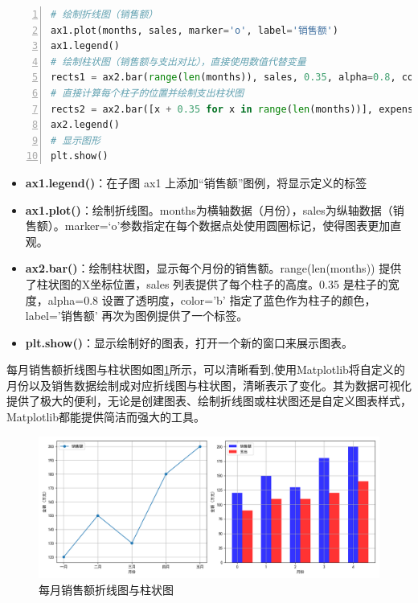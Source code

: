 \begin{lstlisting}[language={python},label={Matplotlib简单操作2},caption={Matplotlib简单操作2}, basicstyle=\footnotesize\ttfamily, breaklines=true, numbers=left, frame=single]
# 绘制折线图（销售额）
ax1.plot(months, sales, marker='o', label='销售额')
ax1.legend()
# 绘制柱状图（销售额与支出对比），直接使用数值代替变量
rects1 = ax2.bar(range(len(months)), sales, 0.35, alpha=0.8, color='b', label='销售额')
# 直接计算每个柱子的位置并绘制支出柱状图
rects2 = ax2.bar([x + 0.35 for x in range(len(months))], expenses, 0.35, alpha=0.8, color='r', label='支出')
ax2.legend()
# 显示图形
plt.show()

\end{lstlisting}
\begin{itemize}
    \item \textbf{ax1.legend()}：在子图 ax1 上添加“销售额”图例，将显示定义的标签
    \item \textbf{ax1.plot()}：绘制折线图。months为横轴数据（月份），sales为纵轴数据（销售额）。marker=‘o’参数指定在每个数据点处使用圆圈标记，使得图表更加直观。
    \item \textbf{ax2.bar()}：绘制柱状图，显示每个月份的销售额。range(len(months)) 提供了柱状图的X坐标位置，sales 列表提供了每个柱子的高度。0.35 是柱子的宽度，alpha=0.8 设置了透明度，color='b' 指定了蓝色作为柱子的颜色，label='销售额' 再次为图例提供了一个标签。
    \item \textbf{plt.show()}：显示绘制好的图表，打开一个新的窗口来展示图表。
\end{itemize}
每月销售额折线图与柱状图如图\ref{fig:每月销售额}所示，可以清晰看到,使用Matplotlib将自定义的月份以及销售数据绘制成对应折线图与柱状图，清晰表示了变化。其为数据可视化提供了极大的便利，无论是创建图表、绘制折线图或柱状图还是自定义图表样式，Matplotlib都能提供简洁而强大的工具。
\begin{figure}[H]
    \centering
    \includegraphics[width=0.8\linewidth]{image/6/每月销售额.png}
    \caption{每月销售额折线图与柱状图}
    \label{fig:每月销售额}
\end{figure}

